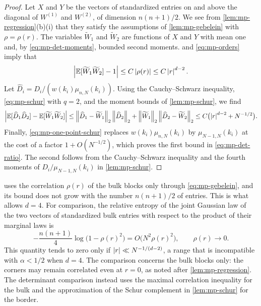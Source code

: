 \begin{proof}
Let $X$ and $Y$ be the vectors of standardized entries on and above the diagonal of $W^{(1)}$ and $W^{(2)}$, of dimension $n(n+1)/2$. We see from \cref{lem:mp-regression}(b)(i) that they satisfy the assumptions of \cref{lem:mp-gebelein} with $\rho=\rho(r)$. The variables $\widetilde W_1$ and $\widetilde W_2$ are functions of $X$ and $Y$ with mean one and, by \eqref{eq:mp-det-moments}, bounded second moments.  and \eqref{eq:mp-orders} imply that
\[
\left|\mathbb E[\widetilde W_1\widetilde W_2]-1\right|\le C\left|\rho(r)\right|\le C\left|r\right|^{d-2}.
\]
Let $\widehat D_i=D_i/(w(k_i)\mu_{n,N}(k_i))$. Using the Cauchy--Schwarz inequality, \eqref{eq:mp-schur} with $q=2$, and the moment bounds of \cref{lem:mp-schur}, we find
\[
\left|\mathbb E[\widehat D_1\widehat D_2]-\mathbb E[\widetilde W_1\widetilde W_2]\right|\le\left\lVert\widehat D_1-\widetilde W_1\right\rVert_2\left\lVert\widehat D_2\right\rVert_2+\left\lVert\widetilde W_1\right\rVert_2\left\lVert\widehat D_2-\widetilde W_2\right\rVert_2\le C\bigl(\left|r\right|^{d-2}+N^{-1/2}\bigr).
\]
Finally, \eqref{eq:mp-one-point-schur} replaces $w(k_i)\mu_{n,N}(k_i)$ by $\mu_{N-1,N}(k_i)$ at the cost of a factor $1+O(N^{-1/2})$, which proves the first bound in \eqref{eq:mp-det-ratio}. The second follows from the Cauchy--Schwarz inequality and the fourth moments of $D_i/\mu_{N-1,N}(k_i)$ in \cref{lem:mp-schur}.
\end{proof}

 uses the correlation $\rho(r)$ of the bulk blocks only through \eqref{eq:mp-gebelein}, and its bound does not grow with the number $n(n+1)/2$ of entries. This is what allows $d=4$. For comparison, the relative entropy of the joint Gaussian law of the two vectors of standardized bulk entries with respect to the product of their marginal laws is
\[
-\frac{n(n+1)}4\log\bigl(1-\rho(r)^2\bigr)=O\bigl(N^2\rho(r)^2\bigr),\qquad\rho(r)\to0.
\]
This quantity tends to zero only if $\left|r\right|\ll N^{-1/(d-2)}$, a range that is incompatible with $\alpha<1/2$ when $d=4$. The comparison concerns the bulk blocks only: the corners may remain correlated even at $r=0$, as noted after \cref{lem:mp-regression}. The determinant comparison instead uses the maximal correlation inequality for the bulk and the approximation of the Schur complement in \cref{lem:mp-schur} for the border.

